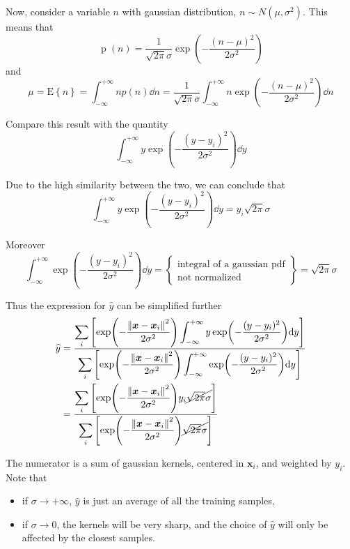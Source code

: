 \documentclass[oneside,onecolumn]{report}
\newcommand{\E}[1]{\text{E} \left\{ #1 \right\}}
\DeclareMathOperator*{\pdf}{p}
\begin{document}
Now, consider a variable $n$ with gaussian distribution, $n \sim N(\mu, \sigma^2)$.
This means that
$$ \pdf(n) = \frac{1}{\sqrt{2 \pi} \sigma} \exp(- \frac{(n - \mu)^2}{2 \sigma^2}) $$
and
$$ \mu = \E{n} = \int_{-\infty}^{+\infty} n p(n) \dd n = \frac{1}{\sqrt{2 \pi} \sigma} \int_{-\infty}^{+\infty} n \exp(- \frac{(n - \mu)^2}{2 \sigma^2}) \dd n $$

Compare this result with the quantity
$$ \int_{-\infty}^{+\infty} y \exp( - \frac{(y - y_i)^2}{2 \sigma^2}) \dd y $$

Due to the high similarity between the two, we can conclude that
$$ \int_{-\infty}^{+\infty} y \exp( - \frac{(y - y_i)^2}{2 \sigma^2}) \dd y = y_i \sqrt{2 \pi} \sigma $$

Moreover
$$ \int_{-\infty}^{+\infty} \exp( - \frac{(y - y_i)^2}{2 \sigma^2}) \dd y = \left\{ \substack{\text{integral of a gaussian pdf} \\ \text{not normalized}} \right\} = \sqrt{2 \pi} \sigma $$

Thus the expression for $\widehat y$ can be simplified further
\begin{align*}
    \widehat y
    &= \frac
    {\displaystyle
        \sum_i
        \left[
            \exp(- \frac{\norm{\bm x - \bm x_i}^2}{2 \sigma^2})
            \int_{-\infty}^{+\infty} y \exp( - \frac{(y - y_i)^2}{2 \sigma^2}) \dd y
        \right]
    }
    {\displaystyle
        \sum_i
        \left[
            \exp(- \frac{\norm{\bm x - \bm x_i}^2}{2 \sigma^2})
            \int_{-\infty}^{+\infty} \exp( - \frac{(y - y_i)^2}{2 \sigma^2}) \dd y
        \right]
    } \\
    &= \frac
    {\displaystyle
        \sum_i
        \left[
            \exp(- \frac{\norm{\bm x - \bm x_i}^2}{2 \sigma^2})
            y_i \cancel{\sqrt{2 \pi} \sigma}
        \right]
    }
    {\displaystyle
        \sum_i
        \left[
            \exp(- \frac{\norm{\bm x - \bm x_i}^2}{2 \sigma^2})
            \cancel{\sqrt{2 \pi} \sigma}
        \right]
    }
\end{align*}

The numerator is a sum of gaussian kernels, centered in $\bm x_i$, and weighted by $y_i$.
Note that
\begin{itemize}
    \item if $\sigma \to +\infty$, $\widehat y$ is just an average of all the training samples,
    \item if $\sigma \to 0$, the kernels will be very sharp, and the choice of $\widehat y$ will only be affected by the closest samples.
\end{itemize}
\end{document}
